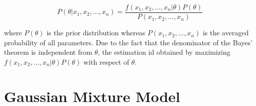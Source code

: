 \begin{equation}
	P (\theta | x_{1}, x_{2}, ... , x_{n}) = \frac{f(x_{1}, x_{2}, ... , x_{n} | \theta) P(\theta)}{P(x_{1}, x_{2}, ... , x_{n})}
\end{equation}

\noindent where $P(\theta)$ is the prior distribution whereas $P(x_{1}, x_{2}, ... , x_{n})$ is the averaged probability of all parameters. Due to the fact that the denominator of the Bayes' theorem is independent from $\theta$, the estimation id obtained by maximizing $f(x_{1}, x_{2}, ... , x_{n} | \theta) P(\theta)$ with respect of $\theta$.


\section{Gaussian Mixture Model}



